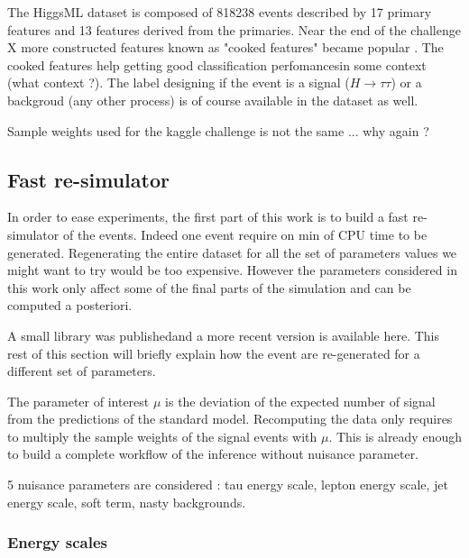 The HiggsML dataset is composed of 818238 events described by 17 primary features and 13 features derived from the primaries.
Near the end of the challenge X more constructed features known as "cooked features" became popular \needcite.
The cooked features help getting good classification perfomances\needcite in some context (what context ?).
The label designing if the event is a signal ($H\to \tau \tau$) or a backgroud (any other process) is of course available in the dataset as well.

Sample weights used for the kaggle challenge is not the same ... why again ?




\subsection{Fast re-simulator} %
\label{sub:fast_re_simulator}



In order to ease experiments, the first part of this work is to build a fast re-simulator of the events.
Indeed one event require on min of CPU time to be generated.
Regenerating the entire dataset for all the set of parameters values we might want to try would be too expensive.
However the parameters considered in this work only affect some of the final parts of the simulation and can be computed a posteriori.

A small library was published\needcite and a more recent version is available here\needcite.
This rest of this section will briefly explain how the event are re-generated for a different set of parameters.

The parameter of interest $\mu$ is the deviation of the expected number of signal from the predictions of the standard model.
Recomputing the data only requires to multiply the sample weights of the signal events with $\mu$.
This is already enough to build a complete workflow of the inference without nuisance parameter.

5 nuisance parameters are considered : tau energy scale, lepton energy scale, jet energy scale, soft term, nasty backgrounds.

\subsubsection{Energy scales} %
\label{ssub:energy_scales}


